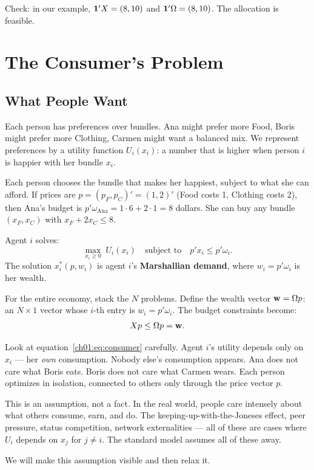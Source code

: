 \documentclass[../structural_economics_book.tex]{subfiles}
\begin{document}
Check: in our example, $\mathbf{1}'X = (8, 10)$ and $\mathbf{1}'\Omega = (8, 10)$. The allocation is feasible.


\section{The Consumer's Problem}
\label{ch01:sec:consumer}

\subsection{What People Want}

Each person has preferences over bundles. Ana might prefer more Food, Boris might prefer more Clothing, Carmen might want a balanced mix. We represent preferences by a utility function $U_i(x_i)$: a number that is higher when person $i$ is happier with her bundle $x_i$.

Each person chooses the bundle that makes her happiest, subject to what she can afford. If prices are $p = (p_F, p_C)' = (1, 2)'$ (Food costs 1, Clothing costs 2), then Ana's budget is $p'\omega_{\text{Ana}} = 1 \cdot 6 + 2 \cdot 1 = 8$ dollars. She can buy any bundle $(x_F, x_C)$ with $x_F + 2x_C \leq 8$.

\begin{definition}\label{ch01:def:consumer_problem}
Agent $i$ solves:
\begin{equation}\label{ch01:eq:consumer}
\max_{x_i \geq 0} \; U_i(x_i) \quad \text{subject to} \quad p'x_i \leq p'\omega_i.
\end{equation}
The solution $x_i^*(p, w_i)$ is agent $i$'s \textbf{Marshallian demand}, where $w_i = p'\omega_i$ is her wealth.
\end{definition}

For the entire economy, stack the $N$ problems. Define the wealth vector $\mathbf{w} = \Omega p$: an $N \times 1$ vector whose $i$-th entry is $w_i = p'\omega_i$. The budget constraints become:
\begin{equation}\label{ch01:eq:budget_system}
Xp \leq \Omega p = \mathbf{w}.
\end{equation}

\begin{intuition}
Look at equation~\eqref{ch01:eq:consumer} carefully. Agent $i$'s utility depends only on $x_i$ --- her \textit{own} consumption. Nobody else's consumption appears. Ana does not care what Boris eats. Boris does not care what Carmen wears. Each person optimizes in isolation, connected to others only through the price vector $p$.

This is an assumption, not a fact. In the real world, people care intensely about what others consume, earn, and do. The keeping-up-with-the-Joneses effect, peer pressure, status competition, network externalities --- all of these are cases where $U_i$ depends on $x_j$ for $j \neq i$. The standard model assumes all of these away.

We will make this assumption visible and then relax it.
\end{intuition}
\end{document}
